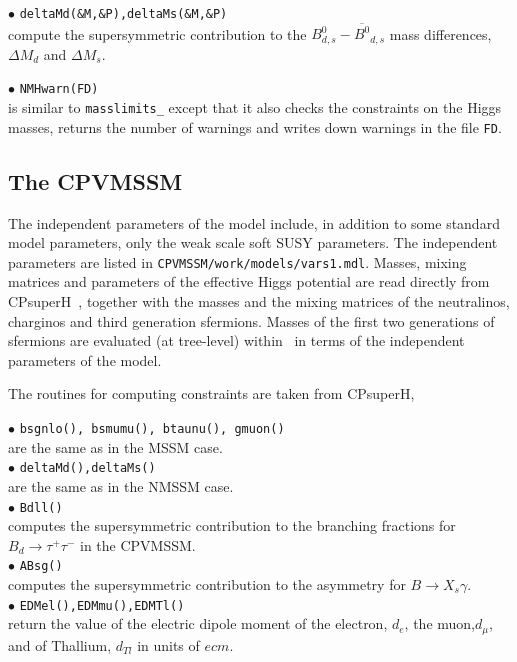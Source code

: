 \documentclass[12pt,a4paper]{article}
\begin{document}
\noindent$\bullet$ {\tt deltaMd(\&M,\&P),deltaMs(\&M,\&P)}\\
compute the supersymmetric contribution to the $B^0_{d,s}-\overline{B^0}_{d,s}$ mass differences, $\Delta M_d$ and $\Delta M_s$.

\noindent$\bullet$ \verb|NMHwarn(FD)|\\
is similar to {\tt masslimits\_} except that it also checks the 
constraints on the Higgs masses, returns the number of warnings and 
writes down  warnings in the file \verb|FD|.  



\subsection{The CPVMSSM}

The independent parameters of the model include,
in addition to some standard model parameters, only the weak scale soft SUSY parameters.
The independent parameters are listed in \verb|CPVMSSM/work/models/vars1.mdl|. 
Masses,
mixing matrices and parameters of the effective Higgs potential are read
directly from CPsuperH~\cite{Lee:2003nta,Lee:2007gn}, together with the masses and
the mixing matrices of the neutralinos, charginos and third generation
sfermions.  Masses of the first two generations
of sfermions are evaluated (at tree-level) within \micro\ in
terms of the independent parameters of the model.

The routines for computing constraints are taken from CPsuperH,~\cite{CPSUPERH}


\noindent
$\bullet$ {\tt bsgnlo(), bsmumu(), btaunu(), gmuon() }\\  
are the same as in the MSSM case.\\

\noindent$\bullet$ \verb|deltaMd(),deltaMs()|\\
are the same as in the NMSSM case.\\ 

\noi$\bullet$ \verb|Bdll()|\\
computes the supersymmetric contribution to the branching fractions for
${B}_d\rightarrow\tau^+\tau^-$ in the CPVMSSM.\\ 

\noi$\bullet$ \verb|ABsg()|\\
computes the supersymmetric contribution to the asymmetry for  ${B}\rightarrow X_s\gamma$.\\ 


\noindent$\bullet$ \verb|EDMel(),EDMmu(),EDMTl()|\\
return the  value of the
electric dipole moment of the electron, $d_e$, the muon,$d_\mu$,   
and of Thallium, $d_{Tl}$ in units of $ecm$. 
\end{document}
